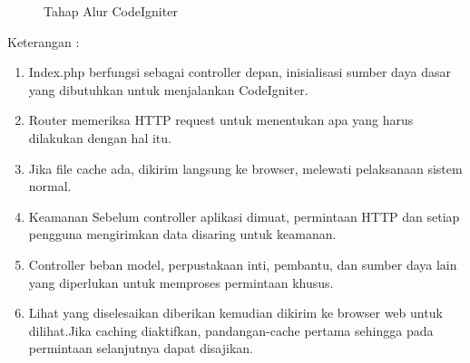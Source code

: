 \begin{figure}[ht]
\caption{Tahap Alur CodeIgniter}
\label{Gambar 3}
\end{figure}
Keterangan :
\begin{enumerate}
\item    Index.php berfungsi sebagai controller depan, inisialisasi sumber daya dasar yang dibutuhkan untuk menjalankan CodeIgniter.
\item    Router memeriksa HTTP request untuk menentukan apa yang harus dilakukan dengan hal itu.
\item   Jika file cache ada, dikirim langsung ke browser, melewati pelaksanaan sistem normal.
\item    Keamanan Sebelum controller aplikasi dimuat, permintaan HTTP dan setiap pengguna mengirimkan data disaring untuk
             keamanan.
\item    Controller beban model, perpustakaan inti, pembantu, dan sumber daya lain yang diperlukan untuk memproses permintaan
            khusus.
\item    Lihat yang diselesaikan diberikan kemudian dikirim ke browser web untuk dilihat.Jika caching diaktifkan, pandangan-cache pertama sehingga pada permintaan selanjutnya dapat disajikan.
\end{enumerate}

